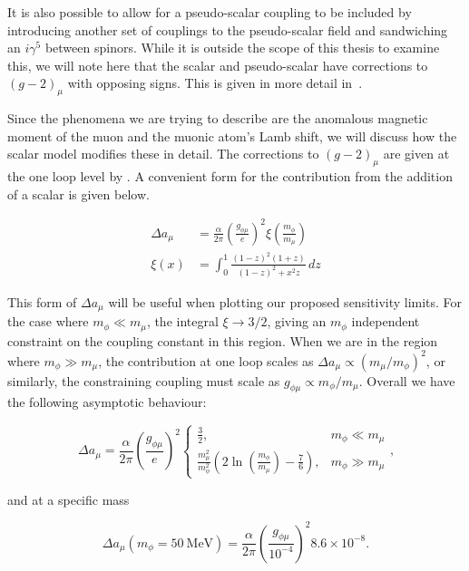 It is also possible to allow for a pseudo-scalar coupling to be included by introducing another set of couplings to the pseudo-scalar field and sandwiching an $i\gamma^5$ between spinors.
While it is outside the scope of this thesis to examine this, we will note here that the scalar and pseudo-scalar have corrections to $(g-2)_\mu$ with opposing signs.
This is given in more detail in~\cite{Carlson:2015jba}.

Since the phenomena we are trying to describe are the anomalous magnetic moment of the muon and the muonic atom's Lamb shift, we will discuss how the scalar model modifies these in detail.
The corrections to $(g-2)_\mu$ are given at the one loop level by \cite{Leveille:1977rc, McKeen:2009ny, TuckerSmith:2010ra}.
A convenient form for the contribution from the addition of a scalar is given below.

\begin{align}
    \Delta a_\mu &= \frac{\alpha}{2\pi} \left(\frac{g_{\phi\mu}}{e}\right)^2 \xi\left(\frac{m_\phi}{m_\mu}\right) \\
    \xi(x) &= \int_0^1 \frac{(1-z)^2(1+z)}{(1-z)^2 + x^2z} \,dz
\end{align}

\noindent This form of $\Delta a_\mu$ will be useful when plotting our proposed sensitivity limits.
For the case where $m_\phi \ll m_\mu$, the integral $\xi \rightarrow 3/2$, giving an $m_\phi$ independent constraint on the coupling constant in this region.
When we are in the region where $m_\phi \gg m_\mu$, the contribution at one loop scales as $\Delta a_\mu \propto (m_\mu/m_\phi)^2$, or similarly, the constraining coupling must scale as $g_{\phi\mu} \propto m_\phi / m_\mu$.
Overall we have the following asymptotic behaviour:

\begin{equation}
    \Delta a_\mu = \frac{\alpha}{2\pi} \left(\frac{g_{\phi \mu}}{e}\right)^2
    \begin{cases}
        \frac{3}{2}, & m_\phi \ll m_\mu \\
        \frac{m_\mu^2}{m_\phi^2} \left(2\ln\left(\frac{m_\phi}{m_\mu}\right) - \frac{7}{6}\right), & m_\phi \gg m_\mu
    \end{cases}\textrm{,}
\end{equation}

\noindent and at a specific mass

\begin{equation}
    \Delta a_\mu\left(m_\phi = 50~\textrm{MeV}\right) = \frac{\alpha}{2\pi} \left(\frac{g_{\phi\mu}}{10^{-4}}\right)^2 8.6\times 10^{-8}\textrm{.}
\end{equation}

